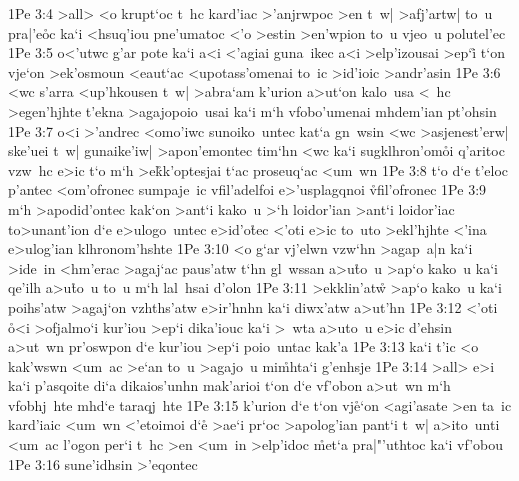 \vs 1Pe 3:4
>all>
<o
krupt`oc
t~hc
kard'iac
>'anjrwpoc
>en
t~w|
>afj'artw|
to~u
pra|'e\r{o}c
ka`i
<hsuq'iou
pne'umatoc
<'o
>estin
>en'wpion
to~u
vjeo~u
polutel'ec\bibvsend
\vs 1Pe 3:5
o<'utwc
g'ar
pote
ka`i
a<i
<'agiai
guna~ikec
a<i
>elp'izousai
>ep`i\r{}
t`on
vje`on
>ek'osmoun
<eaut`ac
<upotass'omenai
to~ic
>id'ioic
>andr'asin\bibvsend
\vs 1Pe 3:6
<wc
s'arra
<up'hkousen
t~w|
>abra`am
k'urion
a>ut`on
kalo~usa
<~hc
>egen'hjhte
t'ekna
>agajopoio~usai
ka`i
m`h
vfobo'umenai
mhdem'ian
pt'ohsin\bibvsend
\vs 1Pe 3:7
o<i
>'andrec
<omo'iwc
sunoiko~untec
kat`a
gn~wsin
<wc
>asjenest'erw|
ske'uei
t~w|
gunaike'iw|
>apon'emontec
tim`hn
<wc
ka`i
sugklhron'om\r{o}i
q'aritoc
vzw~hc
e>ic
t`o
m`h
>e\r{k}k'optesjai
t`ac
proseuq`ac
<um~wn\bibvsend
\vs 1Pe 3:8
t`o
d`e
t'eloc
p'antec
<om'ofronec
sumpaje~ic
vfil'adelfoi
e>'usplagqnoi
\r{vf}il'ofronec\bibvsend
{}
\vs 1Pe 3:9
m`h
>apodid'ontec
kak`on
>ant`i
kako~u
>`h
loidor'ian
>ant`i
loidor'iac
to>unant'ion
d`e
e>ulogo~untec
e>id'o\r{t}ec
<'oti
e>ic
to~uto
>ekl'hjhte
<'ina
e>ulog'ian
klhronom'hshte\bibvsend
\vs 1Pe 3:10
<o
g`ar
vj'elwn
vzw`hn
>agap~a|n
ka`i
>ide~in
<hm'erac
>agaj`ac
paus'atw
t`hn
gl~wssan
a>u\r{t}o~u
>ap`o
kako~u
ka`i
qe'ilh
a>u\r{t}o~u
to~u
m`h
lal~hsai
d'olon\bibvsend
\vs 1Pe 3:11
>ekklin'at\r{w}
>ap`o
kako~u
ka`i
poihs'atw
>agaj`on
vzhths'atw
e>ir'hnhn
ka`i
diwx'atw
a>ut'hn\bibvsend
\vs 1Pe 3:12
<'oti
\r{o}<i
>ofjalmo`i
kur'iou
>ep`i
dika'iouc
ka`i
>~wta
a>uto~u
e>ic
d'ehsin
a>ut~wn
pr'oswpon
d`e
kur'iou
>ep`i
poio~untac
kak'a\bibvsend
\vs 1Pe 3:13
ka`i
t'ic
<o
kak'wswn
<um~ac
>e`an
to~u
>agajo~u
mi\r{m}hta`i
g'enhsje\bibvsend
\vs 1Pe 3:14
>all>
e>i
ka`i
p'asqoite
di`a
dikaios'unhn
mak'arioi
t`on
d`e
vf'obon
a>ut~wn
m`h
vfobhj~hte
mhd`e
taraqj~hte\bibvsend
\vs 1Pe 3:15
k'urion
d`e
t`on
vj\r{e}`on
<agi'asate
>en
ta~ic
kard'iaic
<um~wn
<'etoimoi
d`e\r{}
>ae`i
pr`oc
>apolog'ian
pant`i
t~w|
a>ito~unti
<um~ac
l'ogon
per`i
t~hc
>en
<um~in
>elp'idoc
\r{m}et`a
pra|"'uthtoc
ka`i
vf'obou\bibvsend
\vs 1Pe 3:16
sune'idhsin
>'eqontec
